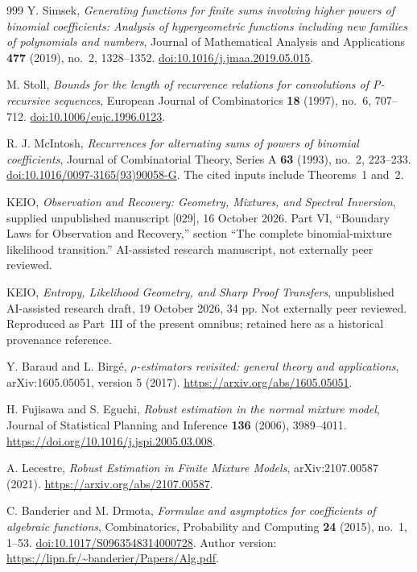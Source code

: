 \documentclass[11pt,a4paper]{article}
\theoremstyle{definition}
\theoremstyle{remark}
\numberwithin{equation}{section}
\begin{document}
\begin{thebibliography}{999}
Y. Simsek,
\emph{Generating functions for finite sums involving higher powers of
binomial coefficients: Analysis of hypergeometric functions including
new families of polynomials and numbers},
Journal of Mathematical Analysis and Applications \textbf{477}
(2019), no.~2, 1328--1352.
\href{https://doi.org/10.1016/j.jmaa.2019.05.015}
{doi:10.1016/j.jmaa.2019.05.015}.

M. Stoll,
\emph{Bounds for the length of recurrence relations for convolutions
of P-recursive sequences},
European Journal of Combinatorics \textbf{18} (1997), no.~6, 707--712.
\href{https://doi.org/10.1006/eujc.1996.0123}
{doi:10.1006/eujc.1996.0123}.

R. J. McIntosh,
\emph{Recurrences for alternating sums of powers of binomial coefficients},
Journal of Combinatorial Theory, Series A \textbf{63}
(1993), no.~2, 223--233.
\href{https://doi.org/10.1016/0097-3165(93)90058-G}
{doi:10.1016/0097-3165(93)90058-G}.
The cited inputs include Theorems~1 and~2.

KEIO, \emph{Observation and Recovery: Geometry, Mixtures, and Spectral
Inversion}, supplied unpublished manuscript [029], 16 October 2026.
Part VI, ``Boundary Laws for Observation and Recovery,'' section
``The complete binomial-mixture likelihood transition.''
AI-assisted research manuscript, not externally peer reviewed.

KEIO, \emph{Entropy, Likelihood Geometry, and Sharp Proof Transfers},
unpublished AI-assisted research draft, 19 October 2026, 34 pp.
Not externally peer reviewed.
Reproduced as Part~III of the present omnibus; retained here as a historical provenance reference.

Y. Baraud and L. Birg\'e,
\emph{$\rho$-estimators revisited: general theory and applications},
arXiv:1605.05051, version 5 (2017).
\url{https://arxiv.org/abs/1605.05051}.

H. Fujisawa and S. Eguchi,
\emph{Robust estimation in the normal mixture model},
Journal of Statistical Planning and Inference \textbf{136} (2006),
3989--4011.
\url{https://doi.org/10.1016/j.jspi.2005.03.008}.

A. Lecestre,
\emph{Robust Estimation in Finite Mixture Models},
arXiv:2107.00587 (2021).
\url{https://arxiv.org/abs/2107.00587}.

C. Banderier and M. Drmota,
\emph{Formulae and asymptotics for coefficients of algebraic functions},
Combinatorics, Probability and Computing \textbf{24} (2015), no.~1, 1--53.
\href{https://doi.org/10.1017/S0963548314000728}{doi:10.1017/S0963548314000728}.
Author version: \url{https://lipn.fr/~banderier/Papers/Alg.pdf}.


\end{thebibliography}
\end{document}
